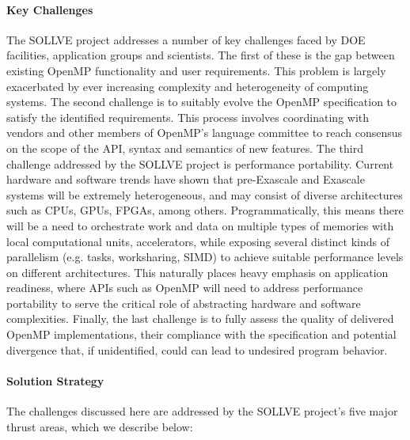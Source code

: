 \paragraph{Key  Challenges}
The SOLLVE project addresses a number of key challenges faced by DOE facilities,
application groups and scientists. The first of these is the gap between
existing OpenMP functionality and user requirements. This problem is largely
exacerbated by ever increasing complexity and heterogeneity of computing
systems.
The second challenge is to suitably evolve the OpenMP specification to satisfy
the identified requirements. This process involves coordinating with vendors
and other members of OpenMP's language committee  to reach consensus on the scope of the API, syntax and semantics of new features.
The third challenge addressed by the SOLLVE project is performance portability.
Current hardware and software trends 
\cite{exascale-roadmap.ijhpca.2011}
 have shown that
pre-Exascale and Exascale systems will be extremely heterogeneous, and may 
consist of  diverse architectures such as
CPUs, GPUs, FPGAs, among others. Programmatically, this means %
there will be a need to orchestrate  
work and data on multiple types of memories with local computational units, accelerators, while exposing several distinct kinds of 
 parallelism (e.g. tasks, worksharing, SIMD) 
to achieve suitable performance levels on different architectures.
This naturally places heavy emphasis on application readiness, where APIs such as 
OpenMP will need to address 
performance portability to serve the critical role
of abstracting hardware and software complexities.
Finally, the last challenge is to fully assess the quality of delivered
OpenMP implementations, their compliance with the specification and potential
divergence that, if unidentified, could can lead to undesired program behavior.


\paragraph{Solution Strategy}
The challenges discussed here are addressed by the SOLLVE project's five major thrust areas, which
we describe below:

